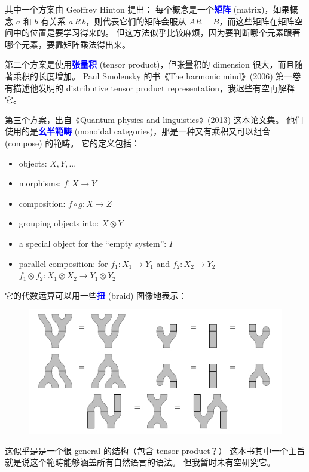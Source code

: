 \documentclass[12pt]{article}
\newcommand{\concept}[1]{\textbf{\textcolor{blue}{#1}}}
\newcommand{\tab}{\hspace*{1cm}}
\begin{document}
其中一个方案由 Geoffrey Hinton 提出： 每个概念是一个\concept{矩阵} (matrix)，如果概念 $a$ 和 $b$ 有关系 $a\, R\, b$，则代表它们的矩阵会服从 $ AR = B $，而这些矩阵在矩阵空间中的位置是要学习得来的。  但这方法似乎比较麻烦，因为要判断哪个元素跟著哪个元素，要靠矩阵乘法得出来。

第二个方案是使用\concept{张量积} (tensor product)，但张量积的 dimension 很大，而且随著乘积的长度增加。 Paul Smolensky 的书《The harmonic mind》(2006) 第一卷有描述他发明的 distributive tensor product representation，我迟些有空再解释它。 

第三个方案，出自《Quantum physics and linguistics》(2013) 这本论文集。 他们使用的是\concept{幺半範畴} (monoidal categories)，那是一种又有乘积又可以组合 (compose) 的範畴。 它的定义包括：
\begin{itemize}
\item objects: $X, Y, ...$
\item morphisms: $f: X \rightarrow Y$
\item composition: $f \circ g : X \rightarrow Z$
\item grouping objects into: $X \otimes Y$
\item a special object for the ``empty system'': $I$
\item parallel composition: for $f_1: X_1 \rightarrow Y_1$ and $f_2: X_2 \rightarrow Y_2$ \\
\tab \tab $f_1 \otimes f_2: X_1 \otimes X_2 \rightarrow Y_1 \otimes Y_2$
\end{itemize}
它的代数运算可以用一些\concept{扭} (braid) 图像地表示：
\begin{figure}[H]
\centering
\includegraphics[scale=0.75]{frobenius_algebra.jpg}
\end{figure}
这似乎是是一个很 general 的结构（包含 tensor product？）  这本书其中一个主旨就是说这个範畴能够涵盖所有自然语言的语法。 但我暂时未有空研究它。
\end{document}
